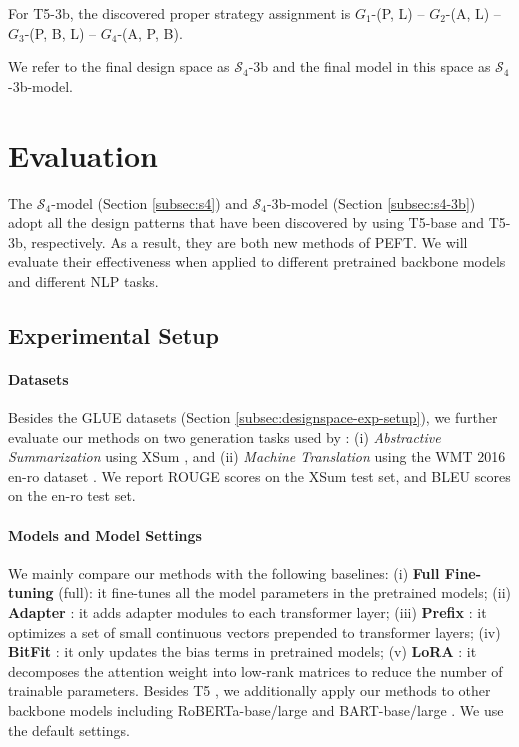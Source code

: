 For T5-3b, the discovered proper strategy assignment is $G_1$-(P, L)  -- $G_2$-(A, L) -- $G_3$-(P, B, L)  -- $G_4$-(A, P, B).

We refer to the final design space as $\mathcal{S}_4$-3b and the final model in this space as $\mathcal{S}_4$-3b-model.

\section{Evaluation}\label{Sec:Experiment}

The $\mathcal{S}_4$-model (Section \ref{subsec:s4}) and $\mathcal{S}_4$-3b-model (Section \ref{subsec:s4-3b})
adopt all the design patterns that have been discovered by using T5-base and T5-3b, respectively. As a result, they are both new methods of PEFT. We will evaluate their effectiveness when applied to different pretrained backbone models and different NLP tasks.

\subsection{Experimental Setup}

\paragraph{Datasets}
Besides the GLUE datasets \citep{Wang2018GLUEAM} (Section \ref{subsec:designspace-exp-setup}), we further evaluate our methods on two generation tasks used by \citet{https://doi.org/10.48550/arxiv.2110.04366}: (i) \textit{Abstractive Summarization} using XSum \citep{narayan-etal-2018-dont}, and (ii)  \textit{Machine Translation} using the WMT 2016 en-ro dataset \citep{bojar-etal-2016-findings}. We report ROUGE scores \citep{lin-2004-rouge} on the XSum test set, and BLEU scores \citep{Papineni2002BleuAM} on the en-ro test set.

\paragraph{Models and Model Settings} We mainly compare our methods with the following baselines: (i) \textbf{Full Fine-tuning} (full): it fine-tunes all the model parameters in the pretrained models; (ii) \textbf{Adapter} \citep{pmlr-v97-houlsby19a}: it adds adapter modules to each transformer layer; (iii) \textbf{Prefix} \citep{li2021Prefixtuning}: it optimizes a set of small continuous vectors prepended to transformer layers; (iv) \textbf{BitFit} \citep{https://doi.org/10.48550/arxiv.2106.10199}: it only updates the bias terms in pretrained models; (v) \textbf{LoRA} \citep{https://doi.org/10.48550/arxiv.2106.09685}: it decomposes the attention weight into low-rank matrices to reduce the number of trainable parameters. Besides T5 \citep{raffel2020exploring}, we additionally apply our methods to other backbone models including RoBERTa-base/large \citep{liu2019roberta} and BART-base/large \citep{lewis2019bart}. We use the default settings.  

